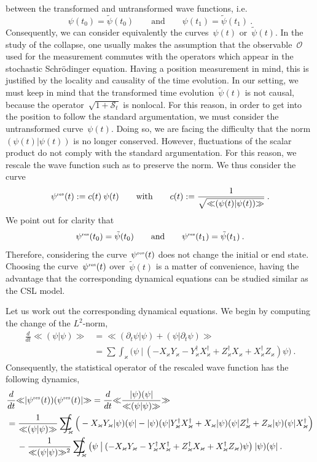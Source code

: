 \documentclass[reqno,11pt]{amsart}
\numberwithin{equation}{section}
\newcommand{\beq}{\begin{equation}}
\newcommand{\eeq}{\end{equation}}
\newcommand{\bbra}{\mathopen{\ll}}
\newcommand{\kket}{\mathclose{\gg}}
\newcommand{\1}{\mathds{1}}
\newcommand{\Sig}{\mathscr{S}}
\newcommand{\sint}{\sum  \!\!\!\!\!\!\! \int }
\newcommand{\res}{\text{\rm{\tiny{res}}}}
\begin{document}
{between the transformed and untransformed wave functions, i.e.\
\[ \psi(t_0) = \tilde{\psi}(t_0) \qquad \text{and} \qquad \psi(t_1) = \tilde{\psi}(t_1) \:. \]
Consequently, we can consider equivalently the curves~$\psi(t)$ or~$\tilde{\psi}(t)$.
In the study of the collapse, one usually makes the assumption that the observable~${\mathcal{O}}$
used for the measurement commutes with the operators which appear in the stochastic Schr\"odinger equation. Having a position measurement in mind, this is justified by the locality and causality of the time evolution.
In our setting, we must keep in mind that the transformed time evolution~$\tilde{\psi}(t)$ is not causal,
because the operator~$\sqrt{1+\Sig_t}$ is nonlocal. For this reason, in order to get into the position to
follow the standard argumentation, we must consider the untransformed curve~$\psi(t)$.
Doing so, we are facing the difficulty that the norm~$(\psi(t)|\psi(t))$ is no longer conserved.
However, fluctuations of the scalar product do not comply with the standard argumentation. For this reason,
we rescale the wave function such as to preserve the norm. We thus consider the curve
\[ %
\psi^\res(t) := c(t)\: \psi(t) \qquad \text{with} \qquad c(t) := \frac{1}{\sqrt{\bbra (\psi(t) | \psi(t)) \kket}} \:. \]
We point out for clarity that
\beq \label{psinit}
\psi^\res(t_0) = \tilde{\psi}(t_0) \qquad \text{and} \qquad \psi^\res(t_1) = \tilde{\psi}(t_1) \:.
\eeq
Therefore, considering the curve~$\psi^\res(t)$ does not change the initial or end state.
Choosing the curve~$\psi^\res(t)$ over~$\tilde{\psi}(t)$ is a matter of convenience, having the advantage
that the corresponding dynamical equations can be studied similar as the CSL model.

Let us work out the corresponding dynamical equations.
We begin by computing the change of the $L^2$-norm,
\begin{align*}
\frac{d}{dt} \bbra (\psi | \psi) \kket &= \bbra (\partial_t \psi | \psi) +  (\psi | \partial_t \psi) \kket \\
&= \sint_\varkappa \big( \psi \:\big|\: (-X_\varkappa Y_\varkappa - Y_\varkappa^\dagger X_\varkappa^\dagger
+ Z_\varkappa^\dagger X_\varkappa + X_\varkappa^\dagger Z_\varkappa) \psi \big) \:.
\end{align*}
Consequently, the statistical operator of the rescaled wave function has the following dynamics,
\begin{align}
&\frac{d}{dt} \bbra |\psi^\res(t))(\psi^\res(t)| \kket = \frac{d}{dt} \bbra \frac{| \psi)(\psi |}{\bbra (\psi | \psi) \kket} \kket \notag \\
&= \frac{1}{\bbra (\psi | \psi) \kket} \sint_\varkappa \Big( - X_\varkappa Y_\varkappa |\psi)(\psi| - |\psi)(\psi| Y_\varkappa^\dagger X_\varkappa^\dagger + X_\varkappa |\psi)(\psi| Z_\varkappa^\dagger + Z_\varkappa |\psi)(\psi| X_\varkappa^\dagger \Big) \notag \\
&\quad\: -\frac{1}{\bbra (\psi | \psi) \kket^2} \sint_\varkappa \big( \psi \:\big|\: (-X_\varkappa Y_\varkappa - Y_\varkappa^\dagger X_\varkappa^\dagger
+ Z_\varkappa^\dagger X_\varkappa + X_\varkappa^\dagger Z_\varkappa) \psi \big) \: |\psi)(\psi| \:.
\label{resred}
\end{align}

}
\end{document}
